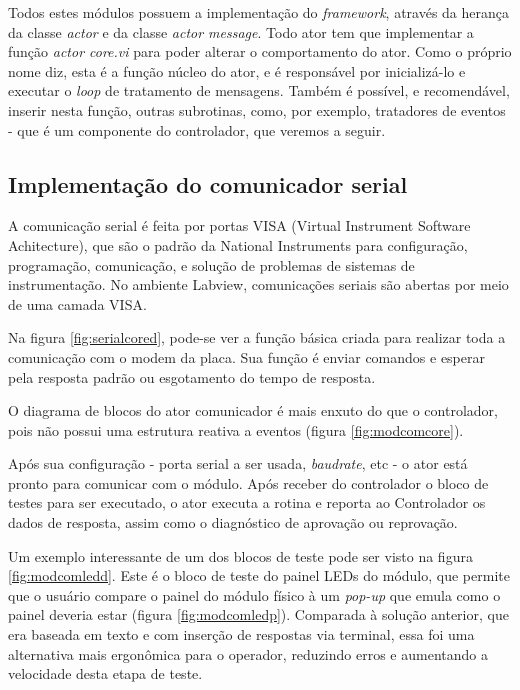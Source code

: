         Todos estes módulos possuem a implementação do \textit{framework}, através da herança da classe \textit{actor} e da classe \textit{actor message}. Todo ator tem que implementar a função \textit{actor core.vi} para poder alterar o comportamento do ator. Como o próprio nome diz, esta é a função núcleo do ator, e é responsável por inicializá-lo e executar o \textit{loop} de tratamento de mensagens. Também é possível, e recomendável, inserir nesta função, outras subrotinas, como, por exemplo, tratadores de eventos - que é um componente do controlador, que veremos a seguir.
        
        \subsection{Implementação do comunicador serial}
        
        A comunicação serial é feita por portas VISA (Virtual Instrument Software Achitecture), que são o padrão da National Instruments para configuração, programação, comunicação, e solução de problemas de sistemas de instrumentação. No ambiente Labview, comunicações seriais são abertas por meio de uma camada VISA.
        
        Na figura \ref{fig:serialcored}, pode-se ver a função básica criada para realizar toda a comunicação com o modem da placa. Sua função é enviar comandos e esperar pela resposta padrão ou esgotamento do tempo de resposta.
        
        O diagrama de blocos do ator comunicador é mais enxuto do que o controlador, pois não possui uma estrutura reativa a eventos (figura \ref{fig:modcomcore}).
        
        Após sua configuração - porta serial a ser usada, \textit{baudrate}, etc - o ator está pronto para comunicar com o módulo. Após receber do controlador o bloco de testes para ser executado, o ator executa a rotina e reporta ao Controlador os dados de resposta, assim como o diagnóstico de aprovação ou reprovação.
        
        Um exemplo interessante de um dos blocos de teste pode ser visto na figura \ref{fig:modcomledd}. Este é o bloco de teste do painel LEDs do módulo, que permite que o usuário compare o painel do módulo físico à um \textit{pop-up} que emula como o painel deveria estar (figura \ref{fig:modcomledp}). Comparada à solução anterior, que era baseada em texto e com inserção de respostas via terminal, essa foi uma alternativa mais ergonômica para o operador, reduzindo erros e aumentando a velocidade desta etapa de teste.
            
